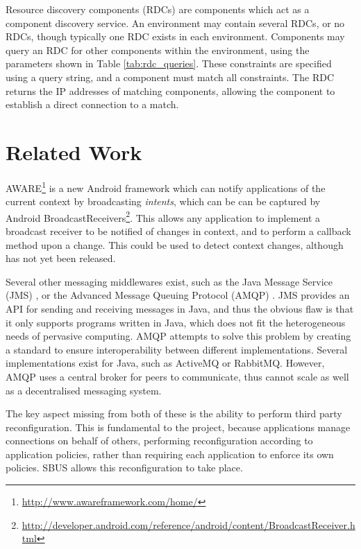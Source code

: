 \documentclass[12pt,twoside,notitlepage]{report}
\begin{document}
Resource discovery components (RDCs) are components which act as a component discovery service. 
An environment may contain several RDCs, or no RDCs, though typically one RDC exists in each environment.
Components may query an RDC for other components within the environment, using the parameters shown in Table \ref{tab:rdc_queries}.
These constraints are specified using a query string, and a component must match all constraints. 
The RDC returns the IP addresses of matching components, allowing the component to establish a direct connection to a match.

\section{Related Work}

AWARE\footnote{\url{http://www.awareframework.com/home/}} is a new Android framework which can notify applications of the current context by broadcasting {\sl intents}, which can be can be captured by Android BroadcastReceivers\footnote{\url{http://developer.android.com/reference/android/content/BroadcastReceiver.html}}. 
This allows any application to implement a broadcast receiver to be notified of changes in context, and to perform a callback method upon a change. 
This could be used to detect context changes, although has not yet been released. 

Several other messaging middlewares exist, such as the Java Message Service (JMS) \cite{hapner2002java}, or the Advanced Message Queuing Protocol (AMQP) \cite{vinoski2006advanced}.
JMS provides an API for sending and receiving messages in Java, and thus the obvious flaw is that it only supports programs written in Java, which does not fit the heterogeneous needs of pervasive computing. 
AMQP attempts to solve this problem by creating a standard to ensure interoperability between different implementations. 
Several implementations exist for Java, such as ActiveMQ or RabbitMQ. 
However, AMQP uses a central broker for peers to communicate, thus cannot scale as well as a decentralised messaging system. 

The key aspect missing from both of these is the ability to perform third party reconfiguration. 
This is fundamental to the project, because applications manage connections on behalf of others, performing reconfiguration according to application policies, rather than requiring each application to enforce its own policies. 
SBUS allows this reconfiguration to take place. 
\end{document}
